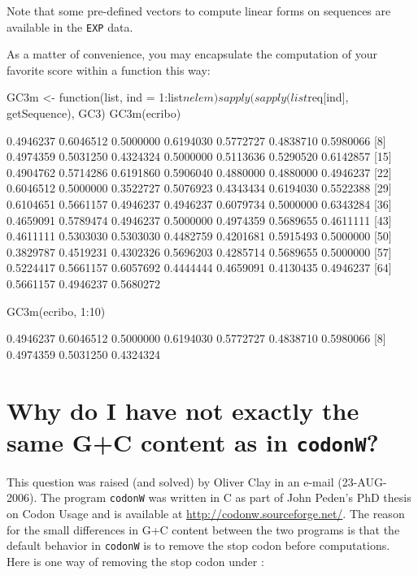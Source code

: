 \documentclass{article}
\begin{document}
Note that some pre-defined vectors to compute linear forms on sequences are
available in the \texttt{EXP} data.

As a matter of convenience, you may encapsulate the computation of your favorite score 
within a function this way:

\begin{Schunk}
\begin{Sinput}
 GC3m <- function(list, ind = 1:list$nelem) sapply(sapply(list$req[ind], 
     getSequence), GC3)
 GC3m(ecribo)
\end{Sinput}
\begin{Soutput}
 [1] 0.4946237 0.6046512 0.5000000 0.6194030 0.5772727 0.4838710 0.5980066
 [8] 0.4974359 0.5031250 0.4324324 0.5000000 0.5113636 0.5290520 0.6142857
[15] 0.4904762 0.5714286 0.6191860 0.5906040 0.4880000 0.4880000 0.4946237
[22] 0.6046512 0.5000000 0.3522727 0.5076923 0.4343434 0.6194030 0.5522388
[29] 0.6104651 0.5661157 0.4946237 0.4946237 0.6079734 0.5000000 0.6343284
[36] 0.4659091 0.5789474 0.4946237 0.5000000 0.4974359 0.5689655 0.4611111
[43] 0.4611111 0.5303030 0.5303030 0.4482759 0.4201681 0.5915493 0.5000000
[50] 0.3829787 0.4519231 0.4302326 0.5696203 0.4285714 0.5689655 0.5000000
[57] 0.5224417 0.5661157 0.6057692 0.4444444 0.4659091 0.4130435 0.4946237
[64] 0.5661157 0.4946237 0.5680272
\end{Soutput}
\begin{Sinput}
 GC3m(ecribo, 1:10)
\end{Sinput}
\begin{Soutput}
 [1] 0.4946237 0.6046512 0.5000000 0.6194030 0.5772727 0.4838710 0.5980066
 [8] 0.4974359 0.5031250 0.4324324
\end{Soutput}
\end{Schunk}

\section{Why do I have not exactly the same G+C content as in \texttt{codonW}?}

This question was raised (and solved) by Oliver Clay in an e-mail (23-AUG-2006).
The program \texttt{codonW} was written in C as part of John Peden's PhD thesis 
on Codon Usage \cite{codonW} and is available at \url{http://codonw.sourceforge.net/}.
The reason for the small differences in G+C content between the two programs is
that the default behavior in \texttt{codonW} is to remove the stop codon before
computations. Here is one way of removing the stop codon under \Rlogo{}:
\end{document}
